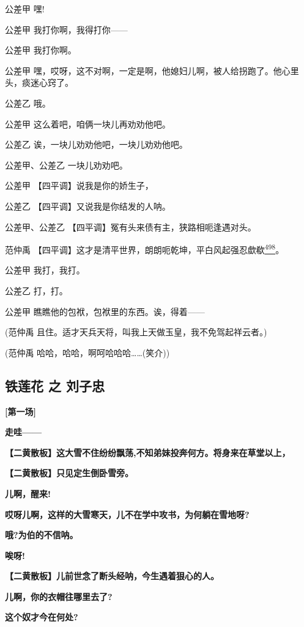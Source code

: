 公差甲 嘿!

公差甲 我打你啊，我得打你------

公差甲 我打你啊。

公差甲
嘿，哎呀，这不对啊，一定是啊，他媳妇儿啊，被人给拐跑了。他心里头，痰迷心窍了。

公差乙 哦。

公差甲 这么着吧，咱俩一块儿再劝劝他吧。

公差乙 诶，一块儿劝劝他吧，一块儿劝劝他吧。

公差甲、公差乙 一块儿劝劝吧。

公差甲 【四平调】说我是你的娇生子，

公差乙 【四平调】又说我是你结发的人呐。

公差甲、公差乙 【四平调】冤有头来债有主，狭路相呃逢遇对头。

范仲禹
【四平调】这才是清平世界，朗朗呃乾坤，平白风起强忍歔欷\protect\hyperlink{fn498}{\textsuperscript{498}}。

公差甲 我打，我打。

公差乙 打，打。

公差甲 瞧瞧他的包袱，包袱里的东西。诶，得着------

(范仲禹 且住。适才天兵天将，叫我上天做玉皇，我不免驾起祥云者。)

(范仲禹 哈哈，哈哈，啊呵哈哈哈\ldots{}\ldots{}(笑介))

\hypertarget{ux94c1ux83b2ux82b1-ux4e4b-ux5218ux5b50ux5fe0}{%
\subsection{铁莲花 之
刘子忠}\label{ux94c1ux83b2ux82b1-ux4e4b-ux5218ux5b50ux5fe0}}

\textbf{{[}第一场{]}}

\textbf{走哇------}

\textbf{【二黄散板】这大雪不住纷纷飘荡,不知弟妹投奔何方。将身来在草堂以上，}

\textbf{【二黄散板】只见定生倒卧雪旁。}

\textbf{儿啊，醒来!}

\textbf{哎呀儿啊，这样的大雪寒天，儿不在学中攻书，为何躺在雪地呀?}

\textbf{哦?为伯的不信呐。}

\textbf{唉呀!}

\textbf{【二黄散板】儿前世念了断头经呐，今生遇着狠心的人。}

\textbf{儿啊，你的衣帽往哪里去了?}

\textbf{这个奴才今在何处?}

